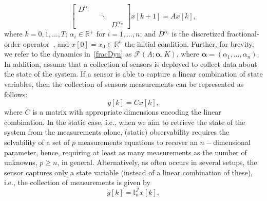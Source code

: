 

\begin{equation}
\label{fracDyn}
\left[ \begin{array}{cccc}
D^{\alpha_1}&&&\\
&&\ddots &\\
&&& D^{\alpha_n}
\end{array}
\right]x[k+1]=Ax[k],  
\end{equation}
where $k=0,1,\ldots, T$; $\alpha_i\in\mathbb{R}^{+}$ for $i=1,\ldots,n$; and $D^{\alpha_i}$ is the discretized fractional-order operator~\cite{fracOrderdiscrete}, and $x[0]=x_0\in\mathbb{R}^n$ the initial condition. Further, for brevity, we refer to the dynamics in~\eqref{fracDyn} as $\mathcal F(A;\boldsymbol{\alpha},K)$, where $\boldsymbol{\alpha}=(\alpha_1,\ldots, \alpha_n)$. In addition, assume that a collection of sensors is deployed to collect data about the state of the system. If a sensor is able to capture a linear combination of state variables, then the collection of sensors measurements can be represented as follows:
\begin{equation}
y[k]=Cx[k],
\label{outputGenericDiscrete}
\end{equation}
where $C$ is a matrix with appropriate dimensions encoding the linear combination. In the static case, i.e., when we aim to retrieve the state of the system from the measurements alone, (static) observability requires the solvability of a set of $p$ measurements equations to recover an $n-$dimensional parameter, hence, requiring at least as many measurements as the number of unknowns, $p\ge n$, in general. Alternatively, as often occurs in several setups, the sensor captures only a state variable (instead of a linear combination of these), i.e., the collection of measurements is given by
\begin{equation}
y[k]=\mathbb{I}_n^{\mathcal J}x[k],
\label{outputDiscrete}
\end{equation}
